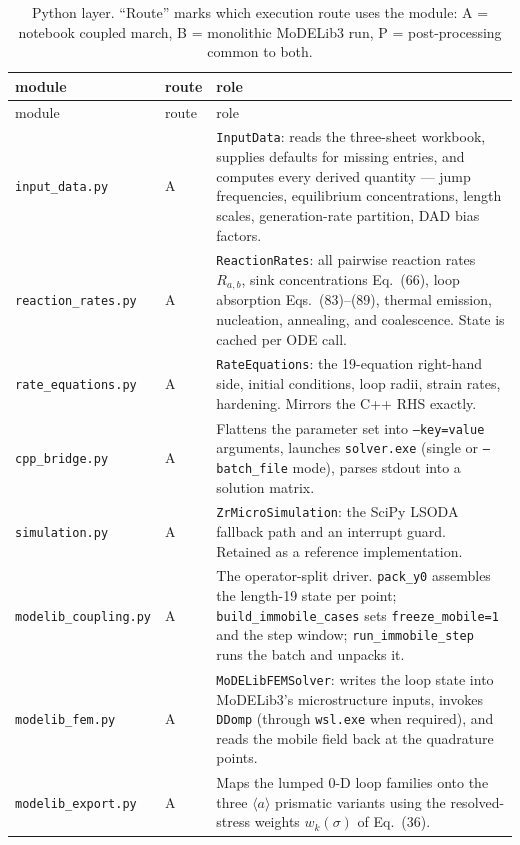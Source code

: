 \documentclass[11pt]{article}
\newcommand{\aloop}{\ensuremath{\langle a\rangle}}
\newcommand{\MoD}{\textsf{MoDELib3}}
\newcommand{\code}[1]{\texttt{\small #1}}
\newcommand{\file}[1]{\texttt{\footnotesize #1}}
\newcommand{\dref}[1]{Eq.~(#1)}
\newcommand{\drefs}[2]{Eqs.~(#1)--(#2)}
\begin{document}
\begin{longtable}{@{}p{}p{}p{}@{}}
\caption{Python layer. ``Route'' marks which execution route uses the module:
A = notebook coupled march, B = monolithic \MoD{} run, P = post-processing
common to both.}
\label{tab:python}\\
\toprule
module & route & role \\
\midrule
\endfirsthead
\toprule
module & route & role \\
\midrule
\endhead
\file{input\_data.py} & A &
  \code{InputData}: reads the three-sheet workbook, supplies defaults for missing
  entries, and computes every derived quantity --- jump frequencies, equilibrium
  concentrations, length scales, generation-rate partition, DAD bias factors. \\
\file{reaction\_rates.py} & A &
  \code{ReactionRates}: all pairwise reaction rates $R_{a,b}$, sink
  concentrations \dref{66}, loop absorption \drefs{83}{89}, thermal emission,
  nucleation, annealing, and coalescence. State is cached per ODE call. \\
\file{rate\_equations.py} & A &
  \code{RateEquations}: the 19-equation right-hand side, initial conditions,
  loop radii, strain rates, hardening. Mirrors the C++ RHS exactly. \\
\file{cpp\_bridge.py} & A &
  Flattens the parameter set into \code{--key=value} arguments, launches
  \code{solver.exe} (single or \code{--batch\_file} mode), parses stdout into a
  solution matrix. \\
\file{simulation.py} & A &
  \code{ZrMicroSimulation}: the SciPy LSODA fallback path and an interrupt
  guard. Retained as a reference implementation. \\
\file{modelib\_coupling.py} & A &
  The operator-split driver. \code{pack\_y0} assembles the length-19 state per
  point; \code{build\_immobile\_cases} sets \code{freeze\_mobile=1} and the step
  window; \code{run\_immobile\_step} runs the batch and unpacks it. \\
\file{modelib\_fem.py} & A &
  \code{MoDELibFEMSolver}: writes the loop state into \MoD{}'s microstructure
  inputs, invokes \code{DDomp} (through \code{wsl.exe} when required), and reads
  the mobile field back at the quadrature points. \\
\file{modelib\_export.py} & A &
  Maps the lumped 0-D loop families onto the three \aloop{} prismatic variants
  using the resolved-stress weights $w_k(\sigma)$ of \dref{36}. \\

\end{longtable}
\end{document}
